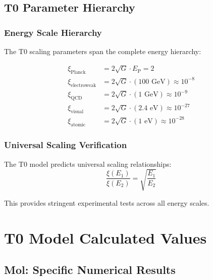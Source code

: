 \documentclass[12pt,a4paper]{article}
\newcommand{\xipar}{\xi}
\newcommand{\EP}{E_{\text{P}}}
\begin{document}
	\subsection{T0 Parameter Hierarchy}
	\label{subsec:t0_parameter_hierarchy}
	
	\subsubsection{Energy Scale Hierarchy}
	\label{subsubsec:energy_scale_hierarchy}
	
	The T0 scaling parameters span the complete energy hierarchy:
	
	\begin{align}
		\xipar_{\text{Planck}} &= 2\sqrt{G} \cdot \EP = 2 \\
		\xipar_{\text{electroweak}} &= 2\sqrt{G} \cdot (100 \text{ GeV}) \approx 10^{-8} \\
		\xipar_{\text{QCD}} &= 2\sqrt{G} \cdot (1 \text{ GeV}) \approx 10^{-9} \\
		\xipar_{\text{visual}} &= 2\sqrt{G} \cdot (2.4 \text{ eV}) \approx 10^{-27} \\
		\xipar_{\text{atomic}} &= 2\sqrt{G} \cdot (1 \text{ eV}) \approx 10^{-28}
	\end{align}
	
	\subsubsection{Universal Scaling Verification}
	\label{subsubsec:universal_scaling_verification}
	
	The T0 model predicts universal scaling relationships:
	\begin{equation}
		\frac{\xipar(E_1)}{\xipar(E_2)} = \sqrt{\frac{E_1}{E_2}}
		\label{eq:universal_scaling_test}
	\end{equation}
	
	This provides stringent experimental tests across all energy scales.
	
	\section{T0 Model Calculated Values}
	\label{sec:t0_calculated_values}
	
	\subsection{Mol: Specific Numerical Results}
	\label{subsec:mol_numerical_results}
	
\end{document}

